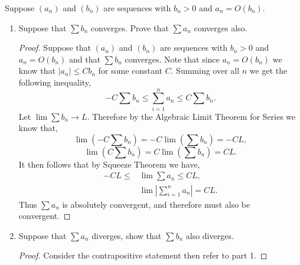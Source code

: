 \documentclass[12pt]{article}
\makeatletter
\theoremstyle{homework}
\newenvironment{exercise}[1]
{\def\@currentlabel{#1}\exercisecore}
{\endexercisecore}
\makeatother
\begin{document}
\begin{exercise}{10} Suppose $(a_n)$ and $(b_n)$ are sequences with $b_n > 0$ and $a_n = O(b_n)$.
  \begin{enumerate}
      \item Suppose that $\sum b_n$ converges. Prove that $\sum a_n$ converges also. \\
      \begin{proof}
        Suppose that $(a_n)$ and $(b_n)$ are sequences with $b_n > 0$ and $a_n = O(b_n)$ and that $\sum b_n$ converges. Note that
        since $a_n = O(b_n)$ we know that $|a_n| \le C b_n$ for some constant $C$. Summing over all $n$ we get the following inequality,
        \begin{equation*}
           -C\sum b_n \le \sum_{i = 1}^{n} a_n \le C\sum b_n.
        \end{equation*}
        Let $\lim \sum b_n \to L$. Therefore by the Algebraic Limit Theorem for Series we know that,
        \begin{equation*}
          \lim(-C\sum b_n) = -C \lim(\sum b_n) = -CL,
        \end{equation*}
        \begin{equation*}
          \lim(C\sum b_n) = C \lim(\sum b_n) = CL.
        \end{equation*}
        It then follows that by Squeeze Theorem we have,
        \begin{align*}
          -CL \le &\lim \sum a_n \le CL,\\ 
          &\lim |\sum_{i = 1}^{n} a_n| = CL.
        \end{align*}
        Thus $\sum a_n$ is absolutely convergent, and therefore must also be convergent.
      \end{proof}
      
      \vspace{.25in}

      \item Suppose that $\sum a_n$ diverges, show that $\sum b_n$ also diverges. 
      \begin{proof}
        Consider the contrapositive statement then refer to part 1. 
      \end{proof}
      \vspace{.25in}



\end{enumerate}
\end{exercise}
\end{document}
